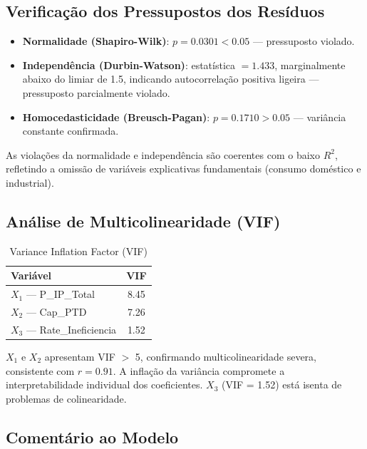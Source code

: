 \documentclass[conference]{IEEEtran}
\begin{document}
\subsection{Verificação dos Pressupostos dos Resíduos}

\begin{itemize}
    \item \textbf{Normalidade (Shapiro-Wilk)}: $p = 0.0301 < 0.05$ --- pressuposto violado.
    \item \textbf{Independência (Durbin-Watson)}: estatística $= 1.433$, marginalmente abaixo do limiar de 1.5, indicando autocorrelação positiva ligeira --- pressuposto parcialmente violado.
    \item \textbf{Homocedasticidade (Breusch-Pagan)}: $p = 0.1710 > 0.05$ --- variância constante confirmada.
\end{itemize}

As violações da normalidade e independência são coerentes com o baixo $R^2$, refletindo a omissão de variáveis explicativas fundamentais (consumo doméstico e industrial).

\subsection{Análise de Multicolinearidade (VIF)}

\begin{table}[htbp]
\caption{Variance Inflation Factor (VIF)}
\label{tab:vif}
\centering
\begin{tabular}{lc}
\hline
\textbf{Variável}               & \textbf{VIF} \\
\hline
$X_1$ --- P\_IP\_Total          & 8.45 \\
$X_2$ --- Cap\_PTD              & 7.26 \\
$X_3$ --- Rate\_Ineficiencia    & 1.52 \\
\hline
\end{tabular}
\end{table}

$X_1$ e $X_2$ apresentam VIF $>$ 5, confirmando multicolinearidade severa, consistente com $r = 0.91$. A inflação da variância compromete a interpretabilidade individual dos coeficientes. $X_3$ (VIF = 1.52) está isenta de problemas de colinearidade.

\subsection{Comentário ao Modelo}
\end{document}
